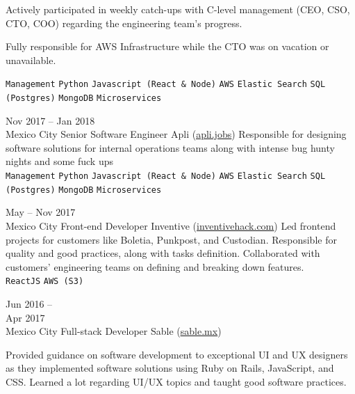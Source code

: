 \documentclass[9pt]{developercv} %
\begin{document}
\begin{entrylist}
{            Actively participated in weekly catch-ups with C-level management (CEO, CSO, CTO, COO) regarding the engineering team's progress.

            Fully responsible for AWS Infrastructure while the CTO was on vacation or unavailable.


            \texttt{Management}
            \slashsep\texttt{Python}
            \slashsep\texttt{Javascript (React \& Node)}
            \slashsep\texttt{AWS}
            \slashsep\texttt{Elastic Search}
            \slashsep\texttt{SQL (Postgres)}
            \slashsep\texttt{MongoDB}
            \slashsep\texttt{Microservices}
        }

    \entry
        {
            Nov 2017 -- Jan 2018
            \\\footnotesize{Mexico City}
        }
        {Senior Software Engineer}
        {Apli ({\href{https://apli.jobs/}{\underline{apli.jobs}}})}
        {
            Responsible for designing software solutions for internal operations teams along with intense bug hunty nights and some fuck ups\\
            \texttt{Management}
            \slashsep\texttt{Python}
            \slashsep\texttt{Javascript (React \& Node)}
            \slashsep\texttt{AWS}
            \slashsep\texttt{Elastic Search}
            \slashsep\texttt{SQL (Postgres)}
            \slashsep\texttt{MongoDB}
            \slashsep\texttt{Microservices}
        }

    \entry
        {
            May -- Nov 2017
            \\\footnotesize{Mexico City}
        }
        {Front-end Developer}
        {Inventive ({\href{https://www.linkedin.com/company/inventivehack/}{\underline{inventivehack.com}}})}
        {
            Led frontend projects for customers like Boletia, Punkpost, and Custodian. Responsible for quality and good practices, along with tasks definition. Collaborated with customers' engineering teams on defining and breaking down features.\\
            \texttt{ReactJS}
            \slashsep\texttt{AWS (S3)}
        }

    \entry
        {
            Jun 2016 -- \\Apr 2017
            \\\footnotesize{Mexico City}
        }
        {Full-stack Developer}
        {Sable ({\href{https://sable.mx/}{\underline{sable.mx}}})}
        {
            Provided guidance on software development to exceptional UI and UX designers as they implemented software solutions using Ruby on Rails, JavaScript, and CSS. Learned a lot regarding UI/UX topics and taught good software practices. 

}
\end{entrylist}
\end{document}
